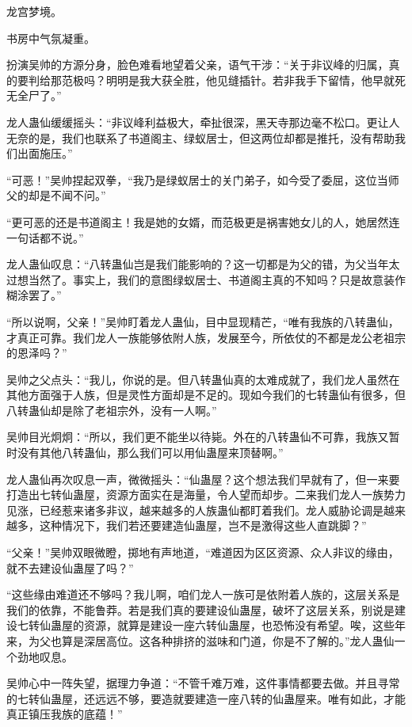 \begin{this_body}
龙宫梦境。

书房中气氛凝重。

扮演吴帅的方源分身，脸色难看地望着父亲，语气干涉：“关于非议峰的归属，真的要判给那范极吗？明明是我大获全胜，他见缝插针。若非我手下留情，他早就死无全尸了。”

龙人蛊仙缓缓摇头：“非议峰利益极大，牵扯很深，黑天寺那边毫不松口。更让人无奈的是，我们也联系了书道阁主、绿蚁居士，但这两位却都是推托，没有帮助我们出面施压。”

“可恶！”吴帅捏起双拳，“我乃是绿蚁居士的关门弟子，如今受了委屈，这位当师父的却是不闻不问。”

“更可恶的还是书道阁主！我是她的女婿，而范极更是祸害她女儿的人，她居然连一句话都不说。”

龙人蛊仙叹息：“八转蛊仙岂是我们能影响的？这一切都是为父的错，为父当年太过想当然了。事实上，我们的意图绿蚁居士、书道阁主真的不知吗？只是故意装作糊涂罢了。”

“所以说啊，父亲！”吴帅盯着龙人蛊仙，目中显现精芒，“唯有我族的八转蛊仙，才真正可靠。我们龙人一族能够依附人族，发展至今，所依仗的不都是龙公老祖宗的恩泽吗？”

吴帅之父点头：“我儿，你说的是。但八转蛊仙真的太难成就了，我们龙人虽然在其他方面强于人族，但是灵性方面却是不足的。现如今我们的七转蛊仙有很多，但八转蛊仙却是除了老祖宗外，没有一人啊。”

吴帅目光炯炯：“所以，我们更不能坐以待毙。外在的八转蛊仙不可靠，我族又暂时没有其他八转蛊仙，那么我们可以用仙蛊屋来顶替啊。”

龙人蛊仙再次叹息一声，微微摇头：“仙蛊屋？这个想法我们早就有了，但一来要打造出七转仙蛊屋，资源方面实在是海量，令人望而却步。二来我们龙人一族势力见涨，已经惹来诸多非议，越来越多的人族蛊仙都盯着我们。龙人威胁论调是越来越多，这种情况下，我们若还要建造仙蛊屋，岂不是激得这些人直跳脚？”

“父亲！”吴帅双眼微瞪，掷地有声地道，“难道因为区区资源、众人非议的缘由，就不去建设仙蛊屋了吗？”

“这些缘由难道还不够吗？我儿啊，咱们龙人一族可是依附着人族的，这层关系是我们的依靠，不能鲁莽。若是我们真的要建设仙蛊屋，破坏了这层关系，别说是建设七转仙蛊屋的资源，就算是建设一座六转仙蛊屋，也恐怖没有希望。唉，这些年来，为父也算是深居高位。这各种排挤的滋味和门道，你是不了解的。”龙人蛊仙一个劲地叹息。

吴帅心中一阵失望，据理力争道：“不管千难万难，这件事情都要去做。并且寻常的七转仙蛊屋，还远远不够，要造就要建造一座八转的仙蛊屋来。唯有如此，才能真正镇压我族的底蕴！”


\end{this_body}
